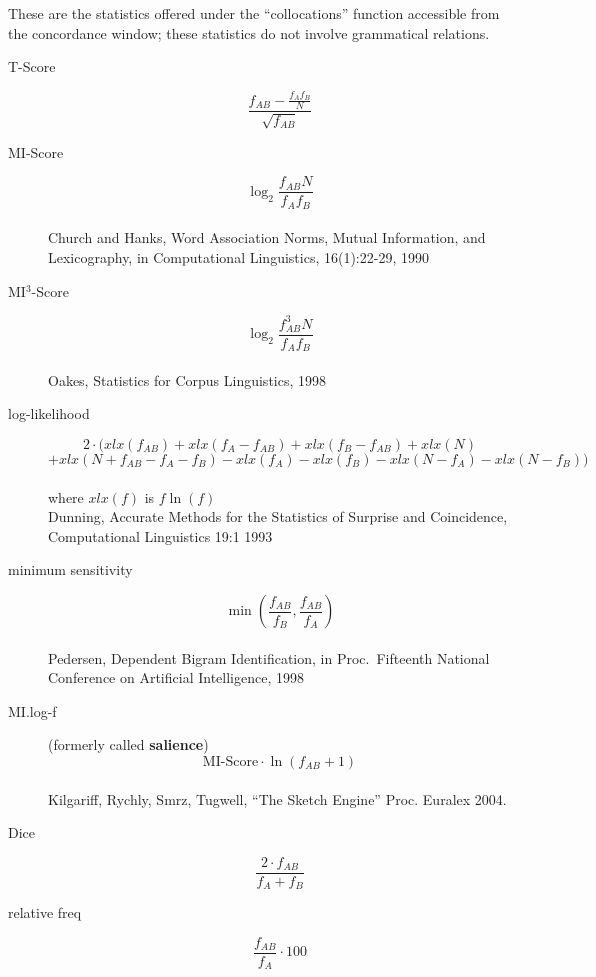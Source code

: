 \documentclass{article}
\begin{document}
These are the statistics offered under the ``collocations'' function accessible from the concordance window; these statistics do not involve grammatical relations.

\begin{description}
\item[T-Score] $$\frac{f_{AB} - \frac{f_A  f_B}{N}}{\sqrt{f_{AB}}}$$

\item[MI-Score] $$\log_2 \frac{f_{AB}  N}{f_A  f_B}$$
\\Church and Hanks, Word Association Norms,
 Mutual Information, and Lexicography, in Computational Linguistics,
 16(1):22-29, 1990

\item[MI$^3$-Score] $$\log_2 \frac{f_{AB}^3  N}{f_A  f_B}$$
\\Oakes, Statistics for Corpus Linguistics, 1998

\item[log-likelihood] $$2 \cdot (xlx(f_{AB}) + xlx(f_A - f_{AB}) + xlx(f_B - f_{AB}) + xlx(N)$$
		$$+ xlx (N + f_{AB} - f_A - f_B) - xlx(f_A) - xlx(f_B) - xlx(N - f_A) - xlx(N - f_B)) $$
\\where $xlx(f)$ is $ f  \ln (f)$
\\Dunning, Accurate Methods for the Statistics of Surprise and
 Coincidence, Computational Linguistics 19:1 1993

\item[minimum sensitivity] $$\min (\frac{f_{AB}}{f_B},\frac{f_{AB}}{f_A})$$
\\Pedersen, Dependent Bigram Identification, in Proc.\
  Fifteenth National Conference on Artificial Intelligence, 1998


\item[MI.log-f] (formerly called {\bf salience}) $$\text{MI-Score} \cdot \ln (f_{AB} + 1)$$
\\Kilgariff, Rychly, Smrz, Tugwell, ``The Sketch Engine'' Proc. Euralex 2004.


\item[Dice] $$ \frac{2 \cdot f_{AB}}{f_A + f_B} $$

\item[relative freq] $$ \frac{f_{AB}}{f_A} \cdot 100$$
\end{description}
\end{document}
